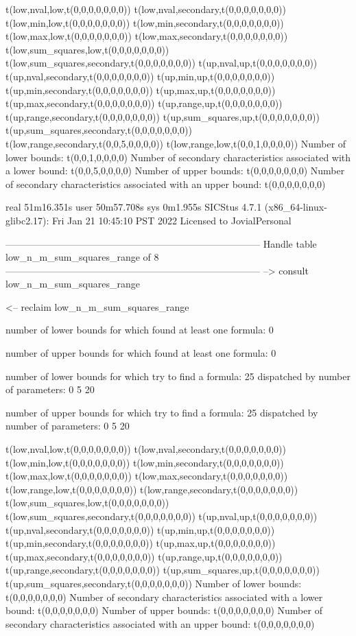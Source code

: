 t(low,nval,low,t(0,0,0,0,0,0,0))
t(low,nval,secondary,t(0,0,0,0,0,0,0))
t(low,min,low,t(0,0,0,0,0,0,0))
t(low,min,secondary,t(0,0,0,0,0,0,0))
t(low,max,low,t(0,0,0,0,0,0,0))
t(low,max,secondary,t(0,0,0,0,0,0,0))
t(low,sum_squares,low,t(0,0,0,0,0,0,0))
t(low,sum_squares,secondary,t(0,0,0,0,0,0,0))
t(up,nval,up,t(0,0,0,0,0,0,0))
t(up,nval,secondary,t(0,0,0,0,0,0,0))
t(up,min,up,t(0,0,0,0,0,0,0))
t(up,min,secondary,t(0,0,0,0,0,0,0))
t(up,max,up,t(0,0,0,0,0,0,0))
t(up,max,secondary,t(0,0,0,0,0,0,0))
t(up,range,up,t(0,0,0,0,0,0,0))
t(up,range,secondary,t(0,0,0,0,0,0,0))
t(up,sum_squares,up,t(0,0,0,0,0,0,0))
t(up,sum_squares,secondary,t(0,0,0,0,0,0,0))
t(low,range,secondary,t(0,0,5,0,0,0,0))
t(low,range,low,t(0,0,1,0,0,0,0))
Number of lower bounds:                                             t(0,0,1,0,0,0,0)
Number of secondary characteristics associated with a lower bound:  t(0,0,5,0,0,0,0)
Number of upper bounds:                                             t(0,0,0,0,0,0,0)
Number of secondary characteristics associated with an upper bound: t(0,0,0,0,0,0,0)

real	51m16.351s
user	50m57.708s
sys	0m1.955s
SICStus 4.7.1 (x86_64-linux-glibc2.17): Fri Jan 21 10:45:10 PST 2022
Licensed to JovialPersonal


--------------------------------------------------------------------------------
Handle table low_n_m_sum_squares_range of 8
--------------------------------------------------------------------------------
--> consult low_n_m_sum_squares_range

<-- reclaim low_n_m_sum_squares_range

number of lower bounds for which found at least one formula: 0

number of upper bounds for which found at least one formula: 0

number of lower bounds for which try to find a formula: 25
dispatched by number of parameters: 0  5  20

number of upper bounds for which try to find a formula: 25
dispatched by number of parameters: 0  5  20

t(low,nval,low,t(0,0,0,0,0,0,0))
t(low,nval,secondary,t(0,0,0,0,0,0,0))
t(low,min,low,t(0,0,0,0,0,0,0))
t(low,min,secondary,t(0,0,0,0,0,0,0))
t(low,max,low,t(0,0,0,0,0,0,0))
t(low,max,secondary,t(0,0,0,0,0,0,0))
t(low,range,low,t(0,0,0,0,0,0,0))
t(low,range,secondary,t(0,0,0,0,0,0,0))
t(low,sum_squares,low,t(0,0,0,0,0,0,0))
t(low,sum_squares,secondary,t(0,0,0,0,0,0,0))
t(up,nval,up,t(0,0,0,0,0,0,0))
t(up,nval,secondary,t(0,0,0,0,0,0,0))
t(up,min,up,t(0,0,0,0,0,0,0))
t(up,min,secondary,t(0,0,0,0,0,0,0))
t(up,max,up,t(0,0,0,0,0,0,0))
t(up,max,secondary,t(0,0,0,0,0,0,0))
t(up,range,up,t(0,0,0,0,0,0,0))
t(up,range,secondary,t(0,0,0,0,0,0,0))
t(up,sum_squares,up,t(0,0,0,0,0,0,0))
t(up,sum_squares,secondary,t(0,0,0,0,0,0,0))
Number of lower bounds:                                             t(0,0,0,0,0,0,0)
Number of secondary characteristics associated with a lower bound:  t(0,0,0,0,0,0,0)
Number of upper bounds:                                             t(0,0,0,0,0,0,0)
Number of secondary characteristics associated with an upper bound: t(0,0,0,0,0,0,0)

